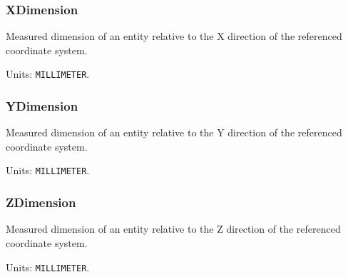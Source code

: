 \subsubsection{XDimension}
\label{sec:XDimension}



Measured dimension of an entity relative to the X direction of the referenced coordinate system.


Units: \texttt{MILLIMETER}.

\subsubsection{YDimension}
\label{sec:YDimension}



Measured dimension of an entity relative to the Y direction of the referenced coordinate system.


Units: \texttt{MILLIMETER}.

\subsubsection{ZDimension}
\label{sec:ZDimension}



Measured dimension of an entity relative to the Z direction of the referenced coordinate system.


Units: \texttt{MILLIMETER}.

